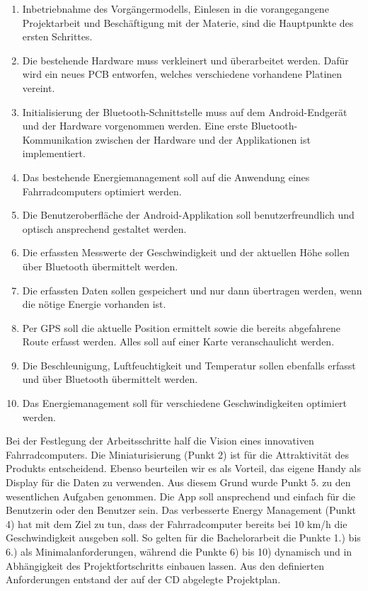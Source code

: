 \begin{enumerate} 

\item Inbetriebnahme des Vorgängermodells, Einlesen in die vorangegangene Projektarbeit und Beschäftigung mit der Materie, sind die Hauptpunkte des ersten Schrittes.
\item Die bestehende Hardware muss verkleinert und überarbeitet werden. Dafür wird ein neues PCB entworfen, welches verschiedene vorhandene Platinen vereint.
\item Initialisierung der Bluetooth-Schnittstelle muss auf dem Android-Endgerät und der Hardware vorgenommen werden. Eine erste Bluetooth-Kommunikation zwischen der Hardware und der Applikationen ist implementiert.
\item Das bestehende Energiemanagement soll auf die Anwendung eines Fahrradcomputers optimiert werden.
\item Die Benutzeroberfläche der Android-Applikation soll benutzerfreundlich und optisch ansprechend gestaltet werden.
\item Die erfassten Messwerte der Geschwindigkeit und der aktuellen Höhe sollen über Bluetooth übermittelt werden.
\item	Die erfassten Daten sollen gespeichert und nur dann übertragen werden, wenn die nötige Energie vorhanden ist.
\item	Per GPS soll die aktuelle Position ermittelt sowie die bereits abgefahrene Route erfasst werden. Alles soll auf einer Karte veranschaulicht werden.
\item	Die Beschleunigung, Luftfeuchtigkeit und Temperatur sollen ebenfalls erfasst und über Bluetooth übermittelt werden.
\item	Das Energiemanagement soll für verschiedene Geschwindigkeiten optimiert werden.
\end{enumerate}

Bei der Festlegung der Arbeitsschritte half die Vision eines innovativen Fahrradcomputers. Die Miniaturisierung (Punkt 2) ist für die Attraktivität des Produkts entscheidend. Ebenso beurteilen wir es als Vorteil, das eigene Handy als Display für die Daten zu verwenden. Aus diesem Grund wurde Punkt 5. zu den wesentlichen Aufgaben genommen. Die App soll ansprechend und einfach für die Benutzerin oder den Benutzer sein. Das verbesserte Energy Management (Punkt 4) hat mit dem Ziel zu tun, dass der Fahrradcomputer bereits bei 10 km/h die Geschwindigkeit ausgeben soll. So gelten für die Bachelorarbeit die Punkte 1.) bis 6.) als Minimalanforderungen, während die Punkte 6) bis 10) dynamisch und in Abhängigkeit des Projektfortschritts einbauen lassen. Aus den definierten Anforderungen entstand der auf der CD abgelegte Projektplan.

